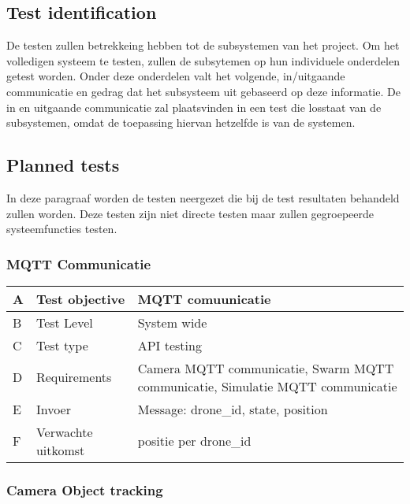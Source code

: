 \newpage

\subsection{Test identification}
De testen zullen betrekkeing hebben tot de subsystemen van het project. Om het volledigen systeem te testen, zullen de subsytemen op hun individuele onderdelen getest worden. Onder deze onderdelen valt het volgende, in/uitgaande communicatie en gedrag dat het subsysteem uit gebaseerd op deze informatie.
De in en uitgaande communicatie zal plaatsvinden in een test die losstaat van de subsystemen, omdat de toepassing hiervan hetzelfde is van de systemen.


\subsection{Planned tests}
In deze paragraaf worden de testen neergezet die bij de test resultaten behandeld zullen worden.
Deze testen zijn niet directe testen maar zullen gegroepeerde systeemfuncties testen. 

\subsubsection{MQTT Communicatie}

\begin{table}[hbt!]
    \begin{tabular}[t]{|m{0.3cm}|m{3.2cm}|m{7.5cm}|}\hline
    A & Test objective & MQTT comuunicatie \\ \hline
    B & Test Level & System wide\\ \hline
    C & Test type & API testing\\ \hline
    D & Requirements & Camera MQTT communicatie, Swarm MQTT communicatie, Simulatie MQTT communicatie\\ \hline
    E & Invoer & Message: drone\_id, state, position\\ \hline
    F & Verwachte uitkomst & positie per drone\_id\\ \hline
    \end{tabular}
\end{table}


\subsubsection{Camera Object tracking}

